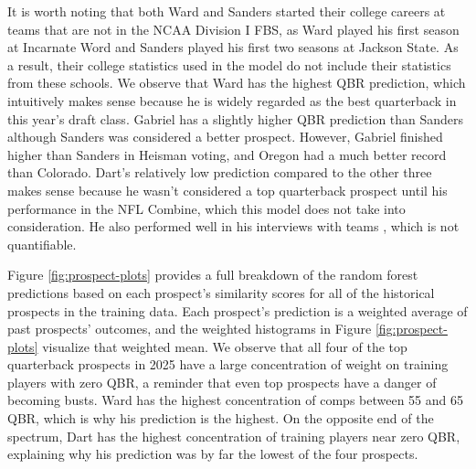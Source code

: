 \documentclass[Review, sageh, times]{sagej}
\begin{document}
It is worth noting that both Ward and Sanders started their college careers at teams that are not in the NCAA Division I FBS, as Ward played his first season at Incarnate Word and Sanders played his first two seasons at Jackson State. As a result, their college statistics used in the model do not include their statistics from these schools. We observe that Ward has the highest QBR prediction, which intuitively makes sense because he is widely regarded as the best quarterback in this year's draft class. Gabriel has a slightly higher QBR prediction than Sanders although Sanders was considered a better prospect. However, Gabriel finished higher than Sanders in Heisman voting, and Oregon had a much better record than Colorado. Dart's relatively low prediction compared to the other three makes sense because he wasn't considered a top quarterback prospect until his performance in the NFL Combine, which this model does not take into consideration. He also performed well in his interviews with teams \citep{traina_qb_2025}, which is not quantifiable.

Figure \ref{fig:prospect-plots} provides a full breakdown of the random forest predictions based on each prospect's similarity scores for all of the historical prospects in the training data. Each prospect's prediction is a weighted average of past prospects' outcomes, and the weighted histograms in Figure \ref{fig:prospect-plots} visualize that weighted mean. We observe that all four of the top quarterback prospects in 2025 have a large concentration of weight on training players with zero QBR, a reminder that even top prospects have a danger of becoming busts. Ward has the highest concentration of comps between 55 and 65 QBR, which is why his prediction is the highest. On the opposite end of the spectrum, Dart has the highest concentration of training players near zero QBR, explaining why his prediction was by far the lowest of the four prospects.
\end{document}
